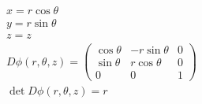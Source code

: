 \begin{example}
\begin{gather}
            x = r \cos \theta \\
            y = r \sin \theta \\
            z = z \\
            D \phi (r, \theta, z) = \begin{pmatrix}
                \cos \theta & -r \sin \theta & 0 \\
                \sin \theta & r \cos \theta & 0 \\
                0 & 0 & 1
            \end{pmatrix}\\
            \det D \phi (r, \theta, z) = r
        \end{gather}
    \end{example}